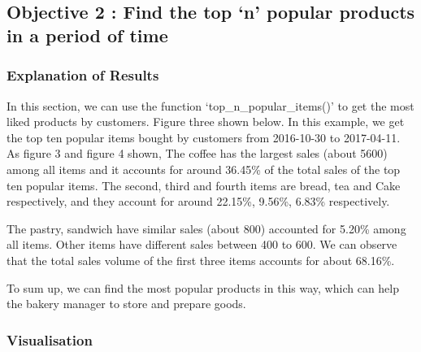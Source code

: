\documentclass[11pt]{article}
\begin{document}
    \begin{center}
    \end{center}
    { \hspace*{\fill} \\}
    
    \begin{center}
    \end{center}
    { \hspace*{\fill} \\}
    
    \hypertarget{objective-2-find-the-top-n-popular-products-in-a-period-of-time}{%
\subsection{Objective 2 : Find the top `n' popular products in a period
of
time}\label{objective-2-find-the-top-n-popular-products-in-a-period-of-time}}

\hypertarget{explanation-of-results}{%
\subsubsection{Explanation of Results}\label{explanation-of-results}}

In this section, we can use the function `top\_n\_popular\_items()' to
get the most liked products by customers. Figure three shown below. In
this example, we get the top ten popular items bought by customers from
2016-10-30 to 2017-04-11. As figure 3 and figure 4 shown, The coffee has
the largest sales (about 5600) among all items and it accounts for
around 36.45\% of the total sales of the top ten popular items. The
second, third and fourth items are bread, tea and Cake respectively, and
they account for around 22.15\%, 9.56\%, 6.83\% respectively.

The pastry, sandwich have similar sales (about 800) accounted for 5.20\%
among all items. Other items have different sales between 400 to 600. We
can observe that the total sales volume of the first three items
accounts for about 68.16\%.

To sum up, we can find the most popular products in this way, which can
help the bakery manager to store and prepare goods.

\hypertarget{visualisation}{%
\subsubsection{Visualisation}\label{visualisation}}
\end{document}
